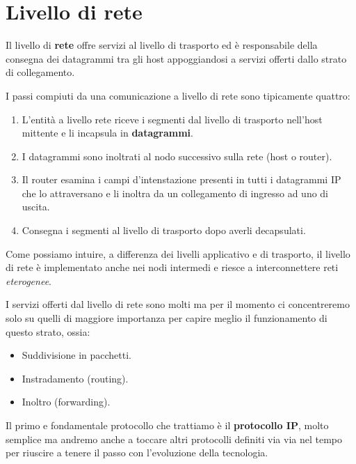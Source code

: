 \chapter{Livello di rete}
Il livello di \textbf{rete} offre servizi al livello di trasporto ed è responsabile della consegna
dei datagrammi tra gli host appoggiandosi a servizi offerti dallo strato di collegamento.

I passi compiuti da una comunicazione a livello di rete sono tipicamente quattro:
\begin{enumerate}
	\item L'entità a livello rete riceve i segmenti dal livello di trasporto nell'host mittente e
		li incapsula in \textbf{datagrammi}.
	\item I datagrammi sono inoltrati al nodo successivo sulla rete (host o router).
	\item Il router esamina i campi d'intenstazione presenti in tutti i datagrammi IP che lo 
		attraversano e li inoltra da un collegamento di ingresso ad uno di uscita.
	\item Consegna i segmenti al livello di trasporto dopo averli decapsulati.
\end{enumerate}
Come possiamo intuire, a differenza dei livelli applicativo e di trasporto, il livello di rete è
implementato anche nei nodi intermedi e riesce a interconnettere reti \emph{eterogenee}.

I servizi offerti dal livello di rete sono molti ma per il momento ci concentreremo solo su quelli
di maggiore importanza per capire meglio il funzionamento di questo strato, ossia:
\begin{itemize}
	\item Suddivisione in pacchetti.
	\item Instradamento (routing).
	\item Inoltro (forwarding).
\end{itemize}
Il primo e fondamentale protocollo che trattiamo è il \textbf{protocollo IP}, molto semplice ma 
andremo anche a toccare altri protocolli definiti via via nel tempo per riuscire a tenere il passo
con l'evoluzione della tecnologia.
